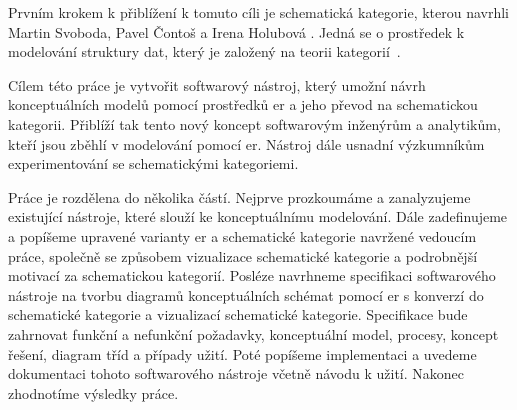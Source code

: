 Prvním krokem k přiblížení k tomuto cíli je schematická kategorie, kterou navrhli Martin Svoboda, Pavel Čontoš a Irena Holubová \cite{svoboda_categorical_2021}.
Jedná se o prostředek k modelování struktury dat, který je založený na teorii kategorií~\cite{eilenberg_generaltheory_1945}.

Cílem této práce je vytvořit softwarový nástroj, který umožní návrh konceptuálních modelů pomocí prostředků \acrshort{er} a jeho převod na schematickou kategorii.
Přiblíží tak tento nový koncept softwarovým inženýrům a analytikům, kteří jsou zběhlí v modelování pomocí \acrshort{er}.
Nástroj dále usnadní výzkumníkům experimentování se schematickými kategoriemi.

Práce je rozdělena do několika částí.
Nejprve prozkoumáme a zanalyzujeme existující nástroje, které slouží ke konceptuálnímu modelování.
Dále zadefinujeme a popíšeme upravené varianty \acrshort{er} a schematické kategorie navržené vedoucím práce, společně se způsobem vizualizace schematické kategorie a podrobnější motivací za schematickou kategorií.
Posléze navrhneme specifikaci softwarového nástroje na tvorbu diagramů konceptuálních schémat pomocí \acrshort{er} s konverzí do schematické kategorie a vizualizací schematické kategorie.
Specifikace bude zahrnovat funkční a nefunkční požadavky, konceptuální model, procesy, koncept řešení, diagram tříd a případy užití.
Poté popíšeme implementaci a uvedeme dokumentaci tohoto softwarového nástroje včetně návodu k užití.
Nakonec zhodnotíme výsledky práce.
